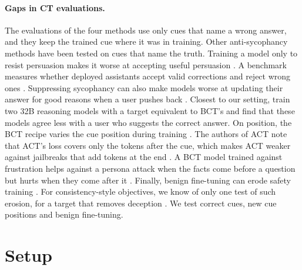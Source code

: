 \documentclass[11pt]{article}
\begin{document}
\paragraph{Gaps in CT evaluations.} The evaluations of the four methods use only cues that name a wrong answer, and they keep the trained cue where it was in training. Other anti-sycophancy methods have been tested on cues that name the truth. Training a model only to resist persuasion makes it worse at accepting useful persuasion \citep{stengel-eskin-etal-2025-teaching}. A benchmark measures whether deployed assistants accept valid corrections and reject wrong ones \citep{sinha2026sycobench}. Suppressing sycophancy can also make models worse at updating their answer for good reasons when a user pushes back \citep{ma2026suppression,yang2026resist}. Closest to our setting, \citet{tang2026unlearning} train two 32B reasoning models with a target equivalent to BCT's and find that these models agree less with a user who suggests the correct answer. On position, the BCT recipe varies the cue position during training \citep{chua2024bct}. The authors of ACT note that ACT's loss covers only the tokens after the cue, which makes ACT weaker against jailbreaks that add tokens at the end \citep{irpan2025consistency}. A BCT model trained against frustration helps against a persona attack when the facts come before a question but hurts when they come after it \citep[App.~E.6]{gautam2026stack}. Finally, benign fine-tuning can erode safety training \citep{qi2024finetuning}. For consistency-style objectives, we know of only one test of such erosion, for a target that removes deception \citep{tang2026unlearning}. We test correct cues, new cue positions and benign fine-tuning.

\section{Setup}
\label{sec:setup}
\end{document}

